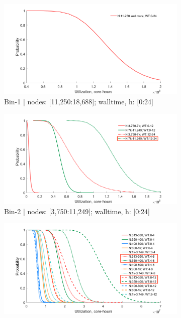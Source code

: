 \begin{figure}
    \centering
    \begin{subfigure}{.5\textwidth}
        \centering
        \includegraphics[width=.83\linewidth]{pics/proj-all-probability-distr-bin1.png}
        \caption{Bin-1 | nodes: [11,250:18,688]; walltime, h: [0:24]}
    \end{subfigure}
    \begin{subfigure}{.5\textwidth}
        \centering
        \includegraphics[width=.83\linewidth]{pics/proj-all-probability-distr-bin2.png}
        \caption{Bin-2 | nodes: [3,750:11,249]; walltime, h: [0:24]}
    \end{subfigure}
    \begin{subfigure}{.5\textwidth}
        \centering
        \includegraphics[width=.83\linewidth]{pics/proj-all-probability-distr-bin3.png}

\end{subfigure}
\end{figure}

